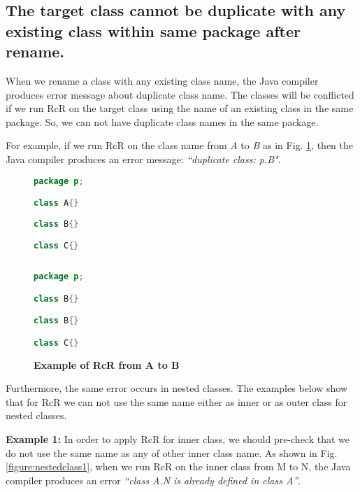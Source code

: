 \subsection{The target class cannot be duplicate with any existing class within same package after rename.}

When we rename a class with any existing class name, the Java compiler produces error message about duplicate class name. The classes will be conflicted if we run RcR on the target class using the name of an existing class in the same package. So, we can not have duplicate class names in the same package. 

For example, if we run RcR on the class name from \textsl{A} to \textsl{B} as in Fig. \ref{fig:afterrr}, then the Java compiler produces an error message: \textit{``duplicate class: p.B"}.

\begin{figure}[th]
\centering
\begin{minipage}[t]{0.45\linewidth}
\begin{lstlisting}[language=java, basicstyle=\scriptsize\ttfamily,frame=single]
package p;

class A{}
	
class B{}

class C{}
 
\end{lstlisting}
\end{minipage}
\hfill
\begin{minipage}[t]{0.45\linewidth}
\begin{lstlisting}[language=java, basicstyle=\scriptsize\ttfamily,frame=single]
package p;

class B{}	

class B{}

class C{}

\end{lstlisting}
\end{minipage}
\caption{\textbf{Example of RcR from A to B}}
\label{fig:afterrr}
\end{figure}


Furthermore, the same error occurs in nested classes. The examples below show that for RcR we can not use the same name either as inner or as outer class for nested classes.


\textbf{Example 1:} In order to apply RcR for inner class, we should pre-check that we do not use the same name as any of other inner class name. As shown in Fig. \ref{figure:nestedclass1}, when we run RcR on the inner class from M to N, the Java compiler produces an error \textit{``class A.N is already defined in class A''}. 

